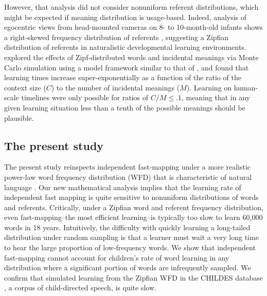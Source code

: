 \documentclass[a4paper,natbib,man]{apa6}
\begin{document}
However, that analysis did not consider nonuniform referent distributions, which might be expected if meaning distribution is usage-based. 
Indeed, analysis of egocentric views from head-mounted cameras on 8- to 10-month-old infants shows a right-skewed frequency distribution of referents \citep{Clerkin:2017}, suggesting a Zipfian distribution of referents in naturalistic developmental learning environments. 
\cite{Vogt:2012} explored the effects of Zipf-distributed words and incidental meanings via Monte Carlo simulation using a model framework similar to that of \cite{Blythe:2010}, and found that learning times increase super-exponentially as a function of the ratio of the context size ($C$) to the number of incidental meanings ($M$). 
Learning on human-scale timelines were only possible for ratios of $C/M \leq .1$, meaning that in any given learning situation less than a tenth of the possible meanings should be plausible. 



\subsection{The present study}

The present study reinspects independent fast-mapping under a more realistic power-law word frequency distribution (WFD) that is characteristic of natural language \citep{Zipf:1949}. 
Our new mathematical analysis implies that the learning rate of independent fast mapping is quite sensitive to nonuniform distributions of words and referents. 
Critically, under a Zipfian word and referent frequency distribution, even fast-mapping--the most efficient learning--is typically too slow to learn 60,000 words in 18 years. 
Intuitively, the difficulty with quickly learning a long-tailed distribution under random sampling is that a learner must wait a very long time to hear the large proportion of low-frequency words.
We show that independent fast-mapping cannot account for children's rate of word learning in any distribution where a significant portion of words are infrequently sampled. 
We confirm that simulated learning from the Zipfian WFD in the CHILDES database \citep{MacWhinney1990}, a corpus of child-directed speech, is quite slow.

\end{document}
